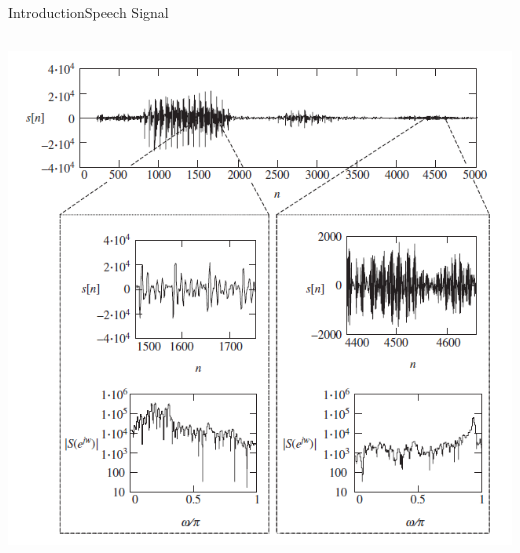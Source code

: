 \begin{frame}{Introduction}{Speech Signal}
\begin{center}
\begin{columns}
\begin{column}{0.5\textwidth}
	    \includegraphics[width=1\textwidth]{figures/VoicedvsUnvoiced}
		\end{column}
	\end{columns}
	\end{center}
\end{frame}

